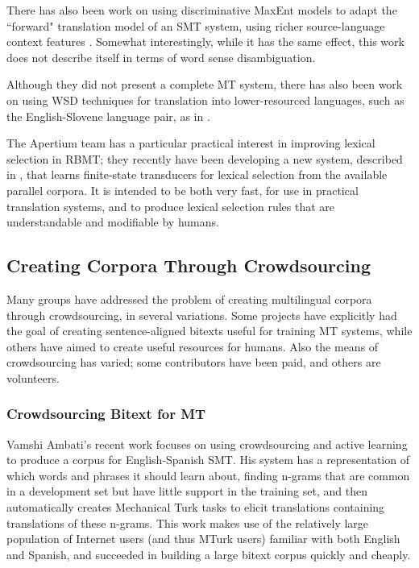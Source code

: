 There has also been work on using discriminative MaxEnt models to adapt
the ``forward" translation model of an SMT system, using richer
source-language context features \cite{vzabokrtsky-popel-marevcek:2010:WMT}.
Somewhat interestingly, while it has the same effect, this work does not
describe itself in terms of word sense disambiguation.

Although they did not present a complete MT system, there has also been work
on using WSD techniques for translation into lower-resourced languages, such as
the English-Slovene language pair, as in
\cite{vintar-fivser-vrvsvcaj:2012:ESIRMT-HyTra2012}. 

The Apertium team has a particular practical interest in improving lexical
selection in RBMT; they recently have been developing
a new system, described in \cite{tyers-fst}, that learns finite-state
transducers for lexical selection from the available parallel corpora. It is
intended to be both very fast, for use in practical translation systems, and
to produce lexical selection rules that are understandable and modifiable by
humans.

\subsection{Creating Corpora Through Crowdsourcing}
Many groups have addressed the problem of creating multilingual corpora through
crowdsourcing, in several variations. Some projects have explicitly had the
goal of creating sentence-aligned bitexts useful for training MT systems, while
others have aimed to create useful resources for humans. Also the means of
crowdsourcing has varied; some contributors have been paid, and others are
volunteers.

\subsubsection{Crowdsourcing Bitext for MT}
Vamshi Ambati's recent work \cite{ambati_naacl,ambati_act} focuses on using
crowdsourcing and active learning to produce a corpus for English-Spanish SMT.
His system has a representation of which words and phrases it should learn
about, finding n-grams that are common in a development set but have little
support in the training set, and then automatically creates Mechanical Turk
tasks to elicit translations containing translations of these n-grams. This
work makes use of the relatively large population of Internet users (and thus
MTurk users) familiar with both English and Spanish, and succeeded in building
a large bitext corpus quickly and cheaply.

